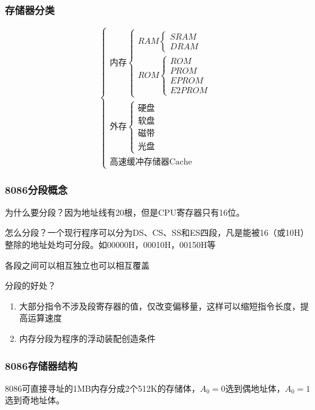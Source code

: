 \subsubsection{存储器分类}
\begin{equation}
    \begin{cases}
        \text{内存}
        \begin{cases}
            RAM
            \begin{cases}
                SRAM\\
                DRAM
            \end{cases}\\
            ROM
            \begin{cases}
                ROM\\
                PROM\\
                EPROM\\
                E2PROM
            \end{cases}
        \end{cases}\\
        \text{外存}
        \begin{cases}
            \text{硬盘}\\
            \text{软盘}\\
            \text{磁带}\\
            \text{光盘}
        \end{cases}\\
        \text{高速缓冲存储器Cache}
    \end{cases}
\end{equation}
\subsubsection{8086分段概念}
为什么要分段？因为地址线有20根，但是CPU寄存器只有16位。

怎么分段？一个现行程序可以分为DS、CS、SS和ES四段，凡是能被16（或10H）整除的地址处均可分段。如00000H，00010H，00150H等

各段之间可以相互独立也可以相互覆盖

分段的好处？
\begin{enumerate}
    \item 大部分指令不涉及段寄存器的值，仅改变偏移量，这样可以缩短指令长度，提高运算速度
    \item 内存分段为程序的浮动装配创造条件
\end{enumerate}
\subsubsection{8086存储器结构}
8086可直接寻址的1MB内存分成2个512K的存储体，$A_0=0$选到偶地址体，$A_0=1$选到奇地址体。

